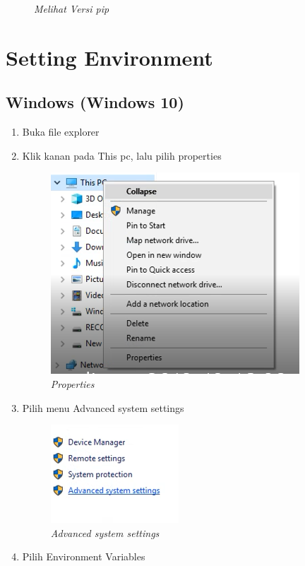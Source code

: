 \begin{enumerate}
\begin{figure}[H]
    \caption{\textit{Melihat Versi pip}}
    \label{Figureanaconda70}
\end{figure}

\end{enumerate}

\section{Setting Environment}
\subsection{Windows (Windows 10)}
\begin{enumerate}
\item Buka file explorer
\item Klik kanan pada This pc, lalu pilih properties
\begin{figure}[H]
    \centering
    \includegraphics[scale=0.7]{figures/properties}
    \caption{\textit{Properties}}
    \label{Environment1}
\end{figure}
\item Pilih menu Advanced system settings
\begin{figure}[H]
    \centering
    \includegraphics[scale=0.7]{figures/advanced}
    \caption{\textit{Advanced system settings}}
    \label{Environment2}
\end{figure}
\item Pilih Environment Variables

\end{enumerate}
